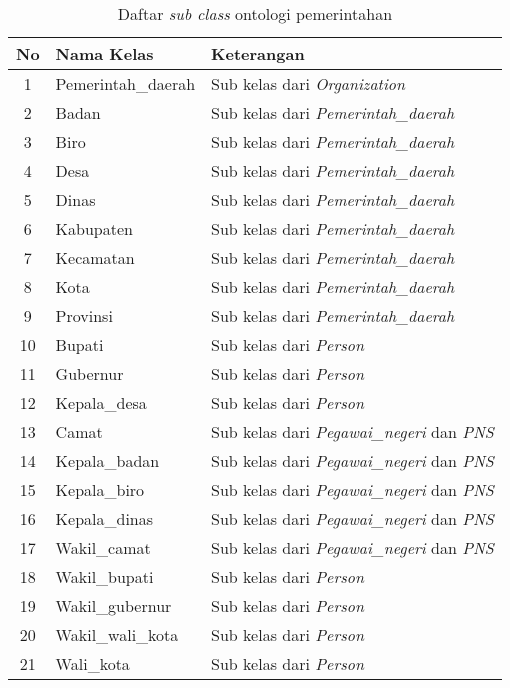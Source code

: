 \begin{table}[ht]
	\caption{Daftar \emph{sub class} ontologi pemerintahan}
	\label{table:sub_class_ontogov}
	\begin{tabularx}{\textwidth}{|c|l|X|}
		\hline
			\textbf{No} & \textbf{Nama Kelas} & \textbf{Keterangan} \\
		\hline
			1 & Pemerintah\_daerah & Sub kelas dari \emph{Organization} \\
		\hline
			2 & Badan & Sub kelas dari \emph{Pemerintah\_daerah} \\
		\hline
			3 & Biro & Sub kelas dari \emph{Pemerintah\_daerah} \\
		\hline
			4 & Desa & Sub kelas dari \emph{Pemerintah\_daerah} \\
		\hline
			5 & Dinas & Sub kelas dari \emph{Pemerintah\_daerah} \\
		\hline
			6 & Kabupaten & Sub kelas dari \emph{Pemerintah\_daerah} \\
		\hline
			7 & Kecamatan & Sub kelas dari \emph{Pemerintah\_daerah} \\
		\hline
			8 & Kota & Sub kelas dari \emph{Pemerintah\_daerah} \\
		\hline
			9 & Provinsi & Sub kelas dari \emph{Pemerintah\_daerah} \\
		\hline
		   10 & Bupati & Sub kelas dari \emph{Person} \\
		\hline
		   11 & Gubernur & Sub kelas dari \emph{Person} \\
		\hline
		   12 & Kepala\_desa & Sub kelas dari \emph{Person} \\
		\hline
		   13 & Camat & Sub kelas dari \emph{Pegawai\_negeri} dan \emph{PNS} \\
		\hline
		   14 & Kepala\_badan & Sub kelas dari \emph{Pegawai\_negeri} dan \emph{PNS} \\
		\hline
		   15 & Kepala\_biro & Sub kelas dari \emph{Pegawai\_negeri} dan \emph{PNS} \\
		\hline
		   16 & Kepala\_dinas & Sub kelas dari \emph{Pegawai\_negeri} dan \emph{PNS} \\
		\hline
		   17 & Wakil\_camat & Sub kelas dari \emph{Pegawai\_negeri} dan \emph{PNS} \\
		\hline
		   18 & Wakil\_bupati & Sub kelas dari \emph{Person} \\
		\hline
		   19 & Wakil\_gubernur & Sub kelas dari \emph{Person} \\
		\hline
		   20 & Wakil\_wali\_kota & Sub kelas dari \emph{Person} \\
		\hline
		   21 & Wali\_kota & Sub kelas dari \emph{Person} \\
		\hline
	\end{tabularx}
\end{table}

